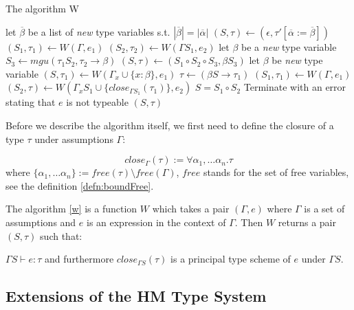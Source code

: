\begin{algorithm}[t]
\caption{The algorithm W \cite{milner1978theory}}
\label{w}
\begin{algorithmic}[1]
    \State let $\overline{\beta}$ be a list of \emph{new} type variables s.t. $|\overline{\beta}| = |\overline{\alpha}|$
    \State $(S, \tau) \gets (\epsilon, \tau' [\overline{\alpha} := \overline{\beta}])$
    \State $(S_1, \tau_1) \gets W(\Gamma, e_1)$
    \State $(S_2, \tau_2) \gets W(\Gamma S_1, e_2)$
    \State let $\beta$ be a \emph{new} type variable
    \State $S_3 \gets mgu (\tau_1 S_2, \tau_2 \rightarrow \beta)$
    \State $(S, \tau) \gets (S_1 \circ S_2 \circ S_3, \beta S_3)$
    \State let $\beta$ be \emph{new} type variable
    \State $(S, \tau_1) \gets W(\Gamma_x \cup \{x : \beta\}, e_1)$
    \State $\tau \gets (\beta S \rightarrow \tau_1)$
    \State $(S_1, \tau_1) \gets W(\Gamma, e_1)$
    \State $(S_2, \tau) \gets W(\Gamma_x S_1 \cup \{close_{\Gamma S_1}(\tau_1)\}, e_2)$
    \State $S = S_1 \circ S_2$
    \Else
    \State Terminate with an error stating that $e$ is not typeable
    \EndIf
    \State \Return $(S, \tau)$
\EndFunction
\end{algorithmic}
\end{algorithm}

Before we describe the algorithm itself, we first need to define the closure of a type $\tau$ under assumptions $\Gamma$:

\begin{defn}
    \label{defn:close}
    $$close_\Gamma(\tau) := \forall \alpha_1, \dots \alpha_n . \tau$$
    where $\{\alpha_1, \dots \alpha_n\} := free(\tau) \setminus free(\Gamma)$, $free$ stands for the set of free variables, see the definition \ref{defn:boundFree}.
\end{defn}

The algorithm \ref{w} is a function $W$ which takes a pair $(\Gamma, e)$ where $\Gamma$ is a set of assumptions and $e$ is an expression in the context of $\Gamma$. Then $W$ returns a pair $(S, \tau)$ such that:

$\Gamma S \vdash e : \tau$ and furthermore $close_{\Gamma S}(\tau)$ is a principal type scheme of $e$ under $\Gamma S$.

\subsection{Extensions of the HM Type System}


